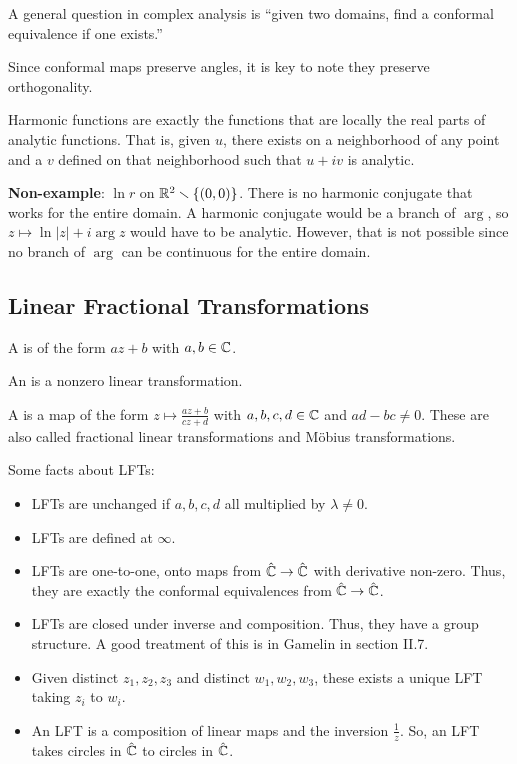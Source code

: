 \documentclass[11pt,leqno,oneside]{amsart}
\numberwithin{thm}{section}
\begin{document}
A general question in complex analysis is ``given two domains, find a conformal
equivalence if one exists.''

Since conformal maps preserve angles, it is key to note they preserve
orthogonality.

\begin{rmk}
  Harmonic functions are exactly the functions that are locally the real parts
  of analytic functions. That is, given $u$, there exists on a neighborhood of
  any point and a $v$ defined on that neighborhood such that $u+iv$ is
  analytic.
\end{rmk}

\begin{example}
  \textbf{Non-example}: $\ln r$ on ${\mathbb R}^2 \smallsetminus \{(0,0)\}$. There is no
  harmonic conjugate that works for the entire domain. A harmonic conjugate
  would be a branch of $\arg$, so $z \mapsto \ln|z|+i\arg z$ would have to be
  analytic. However, that is not possible since no branch of $\arg$ can be
  continuous for the entire domain.
\end{example}

\subsection{Linear Fractional Transformations}
\begin{defn}
    A  is of the form $az + b$ with $a,b \in {\mathbb C}$.
\end{defn}
\begin{defn}
    An  is a nonzero linear transformation.
\end{defn}
\begin{defn}
    A  is a map of the form $z \mapsto
    \frac{az+b}{cz+d}$ with $a,b,c,d \in {\mathbb C}$ and $ad-bc \neq 0$. These are also
    called fractional linear transformations and M{\"o}bius transformations.
  \end{defn}

  Some facts about LFTs:
  \begin{itemize}
  \item LFTs are unchanged if $a,b,c,d$ all multiplied by $\lambda \neq 0$.
  \item LFTs are defined at $\infty$.
  \item LFTs are one-to-one, onto maps from $\hat{{\mathbb C}} \to \hat{{\mathbb C}}$ with
    derivative non-zero. Thus, they are exactly the conformal equivalences from
    $\hat{{\mathbb C}} \to \hat{{\mathbb C}}$.
  \item LFTs are closed under inverse and composition. Thus, they have a group
    structure. A good treatment of this is in Gamelin in section II.7.
  \item Given distinct $z_1,z_2,z_3$ and distinct $w_1,w_2,w_3$, these exists a
    unique LFT taking $z_i$ to $w_i$.
    \item An LFT is a composition of linear maps and the inversion
      $\frac{1}{z}$. So, an LFT takes circles in $\hat{{\mathbb C}}$ to circles in
      $\hat{{\mathbb C}}$.
  \end{itemize}
\end{document}
